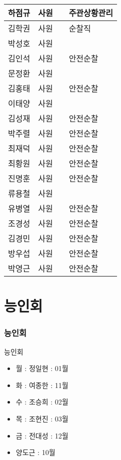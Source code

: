 \documentclass[aspectratio=1610,20pt,xcolor=pdftex,dvipsnames,table,handout]{beamer}
\begin{document}
\begin{frame} [t,plain]
\begin{center}
{\begin{tabularx}{\textwidth}{ p{} p{} p{} p{}   }
				하점규	&	사원	&		&	주관상황관리	 \\ \hline		
				김학권	&	사원	&		&	순찰직	 \\ \hline		
				박성호	&	사원	&		&		 \\ \hline		
				김인석	&	사원	&		&	안전순찰	 \\ \hline		
				문정환	&	사원	&		&		 \\ \hline		
				김홍태	&	사원	&		&	안전순찰	 \\ \hline		
				이태양	&	사원	&		&		 \\ \hline		
				김성재	&	사원	&		&	안전순찰	 \\ \hline		
				박주렬	&	사원	&		&	안전순찰	 \\ \hline		
				최재덕	&	사원	&		&	안전순찰	 \\ \hline		
				최황원	&	사원	&		&	안전순찰	 \\ \hline		
				진명훈	&	사원	&		&	안전순찰	 \\ \hline		
				류용철	&	사원	&		&		 \\ \hline		
				유병열	&	사원	&		&	안전순찰	 \\ \hline		
				조경성	&	사원	&		&	안전순찰	 \\ \hline		
				김경민	&	사원	&		&	안전순찰	 \\ \hline		
				방우섭	&	사원	&		&	안전순찰	 \\ \hline		
				박영근	&	사원	&		&	안전순찰	 \\ \hline		


			\end{tabularx}
}
			\end{center}%




		\end{frame}						

		\section{능인회 }
		\begin{frame} [t,plain]
		\frametitle{능인회 }

			\begin{block} {능인회 }
			\setlength{\leftmargini}{2em}			
			\begin{itemize}
				\item 월 : 정일현 : 01월 \hrulefill
				\item 화 : 여종한 : \hrulefill 11월
				\item 수 : 조승희 : \hrulefill 02월
				\item 목 : 조현진 : \hrulefill 03월
				\item 금 : 전대성 : \hrulefill 12월
				\item 양도근 : \hrulefill 10월

			\end{itemize}
			\end{block}	

		\end{frame}						
\end{document}
